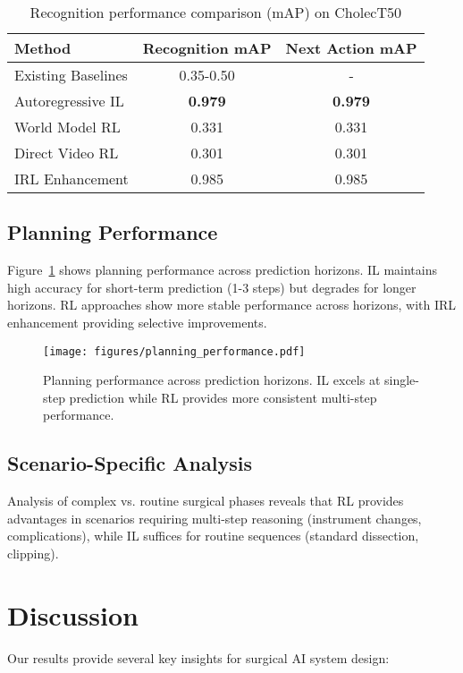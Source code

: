 \documentclass[runningheads]{llncs}
\begin{document}
\begin{table}[t]
\centering
\caption{Recognition performance comparison (mAP) on CholecT50}
\label{tab:recognition}
\begin{tabular}{lcc}
\toprule
Method & Recognition mAP & Next Action mAP \\
\midrule
Existing Baselines & 0.35-0.50 & - \\
Autoregressive IL & \textbf{0.979} & \textbf{0.979} \\
World Model RL & 0.331 & 0.331 \\
Direct Video RL & 0.301 & 0.301 \\
IRL Enhancement & 0.985 & 0.985 \\
\bottomrule
\end{tabular}
\end{table}

\subsection{Planning Performance}

Figure~\ref{fig:planning} shows planning performance across prediction horizons. IL maintains high accuracy for short-term prediction (1-3 steps) but degrades for longer horizons. RL approaches show more stable performance across horizons, with IRL enhancement providing selective improvements.

\begin{figure}[t]
\centering
\texttt{[image: figures/planning\_performance.pdf]}
\caption{Planning performance across prediction horizons. IL excels at single-step prediction while RL provides more consistent multi-step performance.}
\label{fig:planning}
\end{figure}

\subsection{Scenario-Specific Analysis}

Analysis of complex vs. routine surgical phases reveals that RL provides advantages in scenarios requiring multi-step reasoning (instrument changes, complications), while IL suffices for routine sequences (standard dissection, clipping).

\section{Discussion}

Our results provide several key insights for surgical AI system design:
\end{document}
